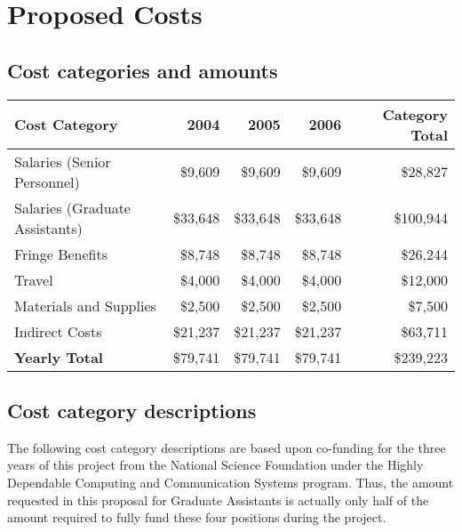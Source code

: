 
\section{Proposed Costs}

\subsection{Cost categories and amounts}

\begin{tabular}{|l|r|r|r|r|} \hline
{\bf Cost Category} & {\bf 2004} & {\bf 2005} & {\bf 2006} & {\bf Category Total} \\ \hline
Salaries (Senior Personnel)      & \$9,609 & \$9,609 & \$9,609 & \$28,827 \\ \hline
Salaries (Graduate Assistants)  & \$33,648 & \$33,648 & \$33,648 & \$100,944  \\ \hline
Fringe Benefits       & \$8,748 & \$8,748 & \$8,748 & \$26,244 \\ \hline
Travel                & \$4,000  & \$4,000  & \$4,000  & \$12,000 \\ \hline
Materials and Supplies & \$2,500   & \$2,500  & \$2,500  & \$7,500  \\ \hline
Indirect Costs         & \$21,237 & \$21,237 & \$21,237 & \$63,711  \\ \hline \hline
{\bf Yearly Total}            & \$79,741  & \$79,741  & \$79,741  & \$239,223 \\ \hline
\end{tabular}

\subsection{Cost category descriptions}

The following cost category descriptions are based upon co-funding
for the three years of this project from the National Science
Foundation under the Highly Dependable Computing and Communication Systems
program. Thus, the amount requested in this proposal for Graduate
Assistants is actually only half of the amount required to fully fund these
four positions during the project.

